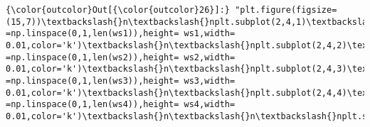 \documentclass[11pt]{article}
\begin{document}
\begin{Verbatim}[commandchars=\\\{\}]
{\color{outcolor}Out[{\color{outcolor}26}]:} "plt.figure(figsize=(15,7))\textbackslash{}n\textbackslash{}nplt.subplot(2,4,1)\textbackslash{}nplt.title('\textasciitilde{}Beta(1,1)')\textbackslash{}nplt.bar(x =np.linspace(0,1,len(ws1)),height= ws1,width= 0.01,color='k')\textbackslash{}n\textbackslash{}nplt.subplot(2,4,2)\textbackslash{}nplt.title('\textasciitilde{}Beta(1,10)')\textbackslash{}nplt.bar(x =np.linspace(0,1,len(ws2)),height= ws2,width= 0.01,color='k')\textbackslash{}n\textbackslash{}nplt.subplot(2,4,3)\textbackslash{}nplt.title('\textasciitilde{}Beta(10,1)')\textbackslash{}nplt.bar(x =np.linspace(0,1,len(ws3)),height= ws3,width= 0.01,color='k')\textbackslash{}n\textbackslash{}nplt.subplot(2,4,4)\textbackslash{}nplt.title('\textasciitilde{}Beta(10,10)')\textbackslash{}nplt.bar(x =np.linspace(0,1,len(ws4)),height= ws4,width= 0.01,color='k')\textbackslash{}n\textbackslash{}n\textbackslash{}nplt.subplot(2,4,5)\textbackslash{}n\#plt.title('f1')\textbackslash{}ncil95s(ms1,cs1,ws1,x1,d\_x1,y1)\textbackslash{}n\textbackslash{}nplt.subplot(2,4,6)\textbackslash{}n\#plt.title('f2')\textbackslash{}ncil95s(ms2,cs2,ws2,x1,d\_x1,y1)\textbackslash{}n\textbackslash{}nplt.subplot(2,4,7)\textbackslash{}n\#plt.title('f3')\textbackslash{}ncil95s(ms3,cs3,ws3,x1,d\_x1,y1)\textbackslash{}n\textbackslash{}nplt.subplot(2,4,8)\textbackslash{}n\#plt.title('f4')\textbackslash{}ncil95s(ms4,cs4,ws4,x1,d\_x1,y1)\textbackslash{}n\textbackslash{}nplt.show()"
\end{Verbatim}
            
\end{document}
